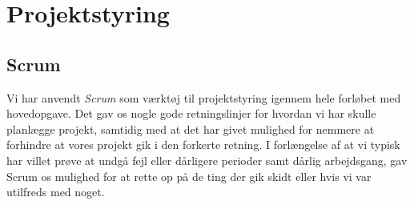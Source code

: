 \section{Projektstyring}
\subsection{Scrum}
Vi har anvendt \textit{Scrum} som værktøj til projektstyring igennem hele forløbet med hovedopgave.
Det gav os nogle gode retningslinjer for hvordan vi har skulle planlægge projekt, samtidig med at det har givet mulighed for nemmere at forhindre at vores projekt gik i den forkerte retning.
I forlængelse af at vi typisk har villet prøve at undgå fejl eller dårligere perioder samt dårlig arbejdsgang, gav Scrum os mulighed for
at rette op på de ting der gik skidt eller hvis vi var utilfreds med noget.

